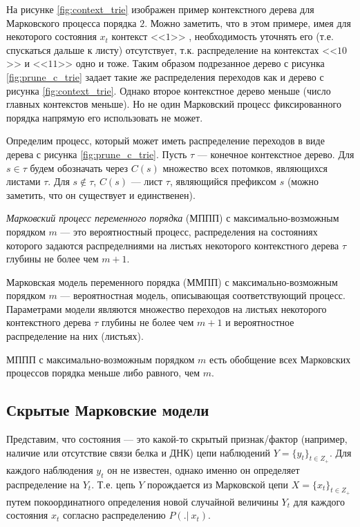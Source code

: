 \documentclass{matmex-diploma-custom}
\begin{document}
На рисунке \ref{fig:context_trie} изображен пример контекстного дерева для Марковского процесса порядка $ 2 $.
Можно заметить, что в этом примере, имея для некоторого состояния $x_{t}$ контекст  <<$1$>> , необходимость уточнять его (т.е. спускаться дальше к листу) отсутствует, т.к. распределение на контекстах  <<$10$>>  и  <<$11$>>  одно и тоже. 
Таким образом подрезанное дерево с рисунка \ref{fig:prune_c_trie} задает такие же распределения переходов как и дерево с рисунка \ref{fig:context_trie}. 
Однако второе контекстное дерево меньше (число главных контекстов меньше).
Но не один Марковский процесс фиксированного порядка напрямую его использовать не может.

Определим процесс, который может иметь распределение переходов в виде дерева с рисунка \ref{fig:prune_c_trie}.
Пусть $\tau$ --- конечное контекстное дерево.
Для $s \in \tau$ будем обозначать через $ C(s) $ множество всех потомков, являющихся листами $\tau$. 
Для $s \notin \tau$, $C(s)$ --- лист $\tau$, являющийся префиксом  $s$ (можно заметить, что он существует и единственен).
\begin{definition}
\textit{Марковский процесс переменного порядка} (МППП) с максимально-возможным порядком $m$ --- это вероятностный процесс, распределения на состояниях которого задаются распределниями на листьях некоторого контекстного дерева $\tau$ глубины не более чем $m+1$.
\label{def:c_trie}
\end{definition}

\begin{definition}
Марковская модель переменного порядка (ММПП) с максимально-возможным порядком $m$ --- вероятностная модель, описывающая соответствующий процесс.
Параметрами модели являются множество переходов на листьях некоторого контекстного дерева $\tau$ глубины не более чем $m+1$ и вероятностное распределение на них (листьях).
\end{definition}

\begin{remark}
МППП с максимально-возможным порядком $m$ есть обобщение всех Марковских процессов порядка меньше либо равного, чем $ m $.
\end{remark}

\subsection{Скрытые Марковские модели}
Представим, что состояния --- это какой-то скрытый признак/фактор (например, наличие или отсутствие связи белка и ДНК) цепи наблюдений $Y = \{y_{t}\}_{t \in Z_{+}}$. Для каждого наблюдения $y_{t}$ он не известен, однако именно он определяет распределение на $Y_{t}$.
Т.е. цепь $Y$ порождается из Марковской цепи $X = \{x_{t}\}_{t \in Z_{+}}$ путем покоординатного определения новой случайной величины $Y_{t}$ для каждого состояния $x_{t}$ согласно распределению $P(.|~x_{t})$.
\end{document}
